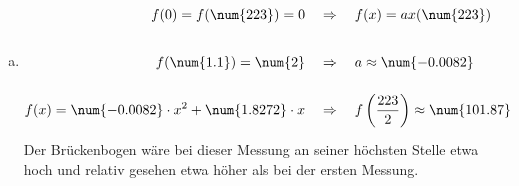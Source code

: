 \begin{exercise}
\begin{enumerate}[a)]
      \item \begin{equation*}
                \begin{split}
                                            f(0)=f(\num{223})=0 \quad&\vstrut\Rightarrow\quad f(x)=ax(\num{223})    \\
                                           f(\num{1.1})=\num{2} \quad&\vstrut\Rightarrow\quad a\approx\num{-0.0082} \\
                f(x)=\num{-0.0082}\cdot x^2+\num{1.8272}\cdot x \quad&\vstrut\Rightarrow\quad f\left(\frac{223}{2}\right)\approx\num{101.87}
              \end{split}
            \end{equation*}
            Der Brückenbogen wäre bei dieser Messung an seiner höchsten Stelle
            etwa  hoch und relativ gesehen etwa  höher als bei
            der ersten Messung.
    \end{enumerate}
  \fi
\end{exercise}
